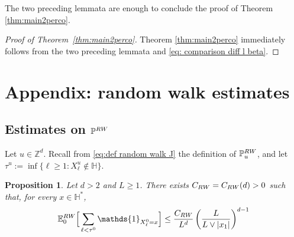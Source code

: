 \documentclass[11pt,a4paper]{article}
\numberwithin{equation}{section}
\theoremstyle{plain}
\newtheorem{Prop}[Thm]{Proposition}
\theoremstyle{definition}
\begin{document}
The two preceding lemmata are enough to conclude the proof of Theorem \ref{thm:main2perco}.

\begin{proof}[Proof of Theorem~\textup{\ref{thm:main2perco}}] Theorem \ref{thm:main2perco} immediately follows from the two preceding lemmata and \eqref{eq: comparison diff l beta}.	
\end{proof}



\appendix
\section{Appendix: random walk estimates}\label{appendix:rw}
\subsection{Estimates on $\mathbb P^{\rm RW}$}
Let $u \in \mathbb Z^d$. Recall from \eqref{eq:def random walk J} the definition of $\mathbb P^{\rm RW}_u$, and let $\tau^u:=\inf \{\ell\geq 1: X_\ell^u\notin \mathbb H\}$.
\begin{Prop}\label{prop: rw estimates} Let $d>2$ and $L\geq 1$. There exists $C_{\rm RW}=C_{\rm RW}(d)>0$ such that, for every $x\in \mathbb H^*$,
\begin{equation}\label{eq:first rw estimates}
	\mathbb E_0^{\rm RW}\Big[\sum_{\ell<\tau^0}\mathds{1}_{X_\ell^0=x}\Big]\leq \frac{C_{\rm RW}}{L^d}\left(\frac{L}{L\vee |x_1|}\right)^{d-1}
\end{equation}
\end{Prop}
\end{document}
